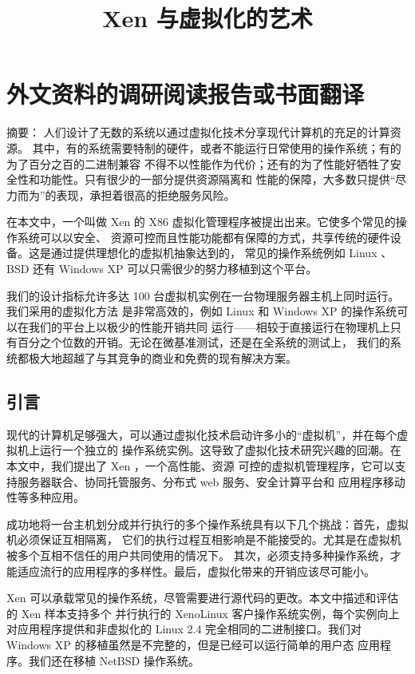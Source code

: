 \chapter{外文资料的调研阅读报告或书面翻译}

\title{Xen 与虚拟化的艺术}

{\heiti 摘要：} 人们设计了无数的系统以通过虚拟化技术分享现代计算机的充足的计算资源。
其中，有的系统需要特制的硬件，或者不能运行日常使用的操作系统；有的为了百分之百的二进制兼容
不得不以性能作为代价；还有的为了性能好牺牲了安全性和功能性。只有很少的一部分提供资源隔离和
性能的保障，大多数只提供“尽力而为”的表现，承担着很高的拒绝服务风险。

在本文中，一个叫做 Xen 的 X86 虚拟化管理程序被提出出来。它使多个常见的操作系统可以以安全、
资源可控而且性能功能都有保障的方式，共享传统的硬件设备。这是通过提供理想化的虚拟机抽象达到的，
常见的操作系统例如 Linux 、 BSD 还有 Windows XP 可以只需很少的努力移植到这个平台。

我们的设计指标允许多达 100 台虚拟机实例在一台物理服务器主机上同时运行。我们采用的虚拟化方法
是非常高效的，例如 Linux 和 Windows XP 的操作系统可以在我们的平台上以极少的性能开销共同
运行——相较于直接运行在物理机上只有百分之个位数的开销。无论在微基准测试，还是在全系统的测试上，
我们的系统都极大地超越了与其竞争的商业和免费的现有解决方案。

\section{引言}

现代的计算机足够强大，可以通过虚拟化技术启动许多小的“虚拟机”，并在每个虚拟机上运行一个独立的
操作系统实例。这导致了虚拟化技术研究兴趣的回潮。在本文中，我们提出了 Xen ，一个高性能、资源
可控的虚拟机管理程序，它可以支持服务器联合、协同托管服务、分布式 web 服务、安全计算平台和
应用程序移动性等多种应用。

成功地将一台主机划分成并行执行的多个操作系统具有以下几个挑战：首先，虚拟机必须保证互相隔离，
它们的执行过程互相影响是不能接受的。尤其是在虚拟机被多个互相不信任的用户共同使用的情况下。
其次，必须支持多种操作系统，才能适应流行的应用程序的多样性。最后，虚拟化带来的开销应该尽可能小。

Xen 可以承载常见的操作系统，尽管需要进行源代码的更改。本文中描述和评估的 Xen 样本支持多个
并行执行的 XenoLinux 客户操作系统实例，每个实例向上对应用程序提供和非虚拟化的 Linux 2.4
完全相同的二进制接口。我们对 Windows XP 的移植虽然是不完整的，但是已经可以运行简单的用户态
应用程序。我们还在移植 NetBSD 操作系统。

